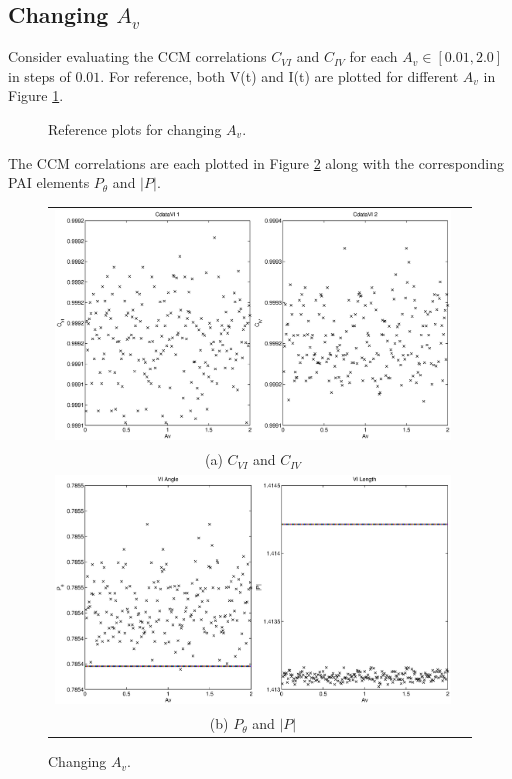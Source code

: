 \documentclass{article}
\begin{document}
\subsection{Changing $A_v$}
Consider evaluating the CCM correlations $C_{VI}$ and $C_{IV}$ for each $A_v\in[0.01,2.0]$ in steps of $0.01$.  For reference, both V(t) and I(t) are plotted for different $A_v$ in Figure \ref{fig:Avref}.
\begin{figure}[H]
\caption{Reference plots for changing $A_v$.}
\label{fig:Avref}
\end{figure}

The CCM correlations are each plotted in Figure \ref{fig:Av} along with the corresponding PAI elements $P_\theta$ and $|P|$.
\begin{figure}[H]
\begin{tabular}{cc}
\includegraphics[scale=0.5]{RLcirc_varyV_amp2.eps} \\
(a) $C_{VI}$ and $C_{IV}$ \\[6pt]
\includegraphics[scale=0.5]{RLcirc_varyV_amp.eps} \\
(b) $P_\theta$ and $|P|$ \\[6pt]
\end{tabular}
\caption{Changing $A_v$.}
\label{fig:Av}
\end{figure}
\end{document}
